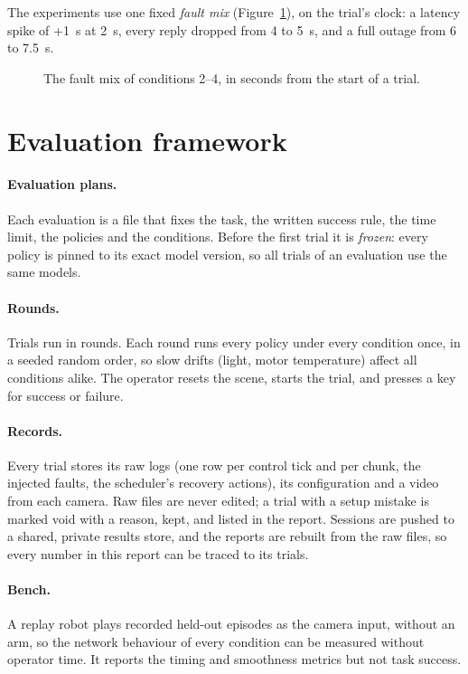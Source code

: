 The experiments use one fixed \emph{fault mix} (Figure~\ref{fig:faultmix}), on the trial's clock: a latency spike of
+1~s at 2~s, every reply dropped from 4 to 5~s, and a full outage from 6 to 7.5~s.

\begin{figure}[htbp]
  \centering
  
  \caption{The fault mix of conditions 2--4, in seconds from the start of a trial.}
  \label{fig:faultmix}
\end{figure}

\section{Evaluation framework}\label{sec:evalsys}

\paragraph{Evaluation plans.} Each evaluation is a file that fixes the task, the written success rule, the time limit,
the policies and the conditions. Before the first trial it is \emph{frozen}: every policy is pinned to its exact model
version, so all trials of an evaluation use the same models.

\paragraph{Rounds.} Trials run in rounds. Each round runs every policy under every condition once, in a seeded random
order, so slow drifts (light, motor temperature) affect all conditions alike. The operator resets the scene, starts
the trial, and presses a key for success or failure.

\paragraph{Records.} Every trial stores its raw logs (one row per control tick and per chunk, the injected faults, the
scheduler's recovery actions), its configuration and a video from each camera. Raw files are never edited; a trial
with a setup mistake is marked void with a reason, kept, and listed in the report. Sessions are pushed to a shared,
private results store, and the reports are rebuilt from the raw files, so every number in this report can be traced to
its trials.

\paragraph{Bench.} A replay robot plays recorded held-out episodes as the camera input, without an arm, so the network
behaviour of every condition can be measured without operator time. It reports the timing and smoothness metrics but
not task success.

